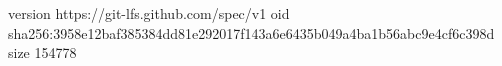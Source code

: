 version https://git-lfs.github.com/spec/v1
oid sha256:3958e12baf385384dd81e292017f143a6e6435b049a4ba1b56abc9e4cf6c398d
size 154778
